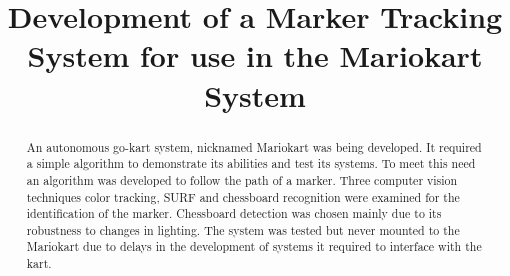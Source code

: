\title{Development of a Marker Tracking System for use in the Mariokart System}

\author{

  \vspace{0.5\baselineskip}


  \vspace{0.5\baselineskip}


  \vspace{0.5\baselineskip}

}

\maketitle

\begin{abstract}
  An autonomous go-kart system, nicknamed Mariokart was being developed. It required a simple algorithm to demonstrate its abilities and test its systems. To meet this need an algorithm was developed to follow the path of a marker. Three computer vision techniques color tracking, SURF and chessboard recognition were examined for the identification of the marker. Chessboard detection was chosen mainly due to its robustness to changes in lighting. The system was tested but never mounted to the Mariokart due to delays in the development of systems it required to interface with the kart.
\end{abstract}

